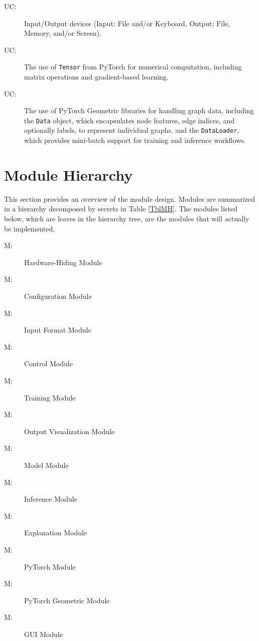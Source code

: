 \documentclass[12pt, titlepage]{article}
\newcounter{ucnum}
\newcommand{\uctheucnum}{UC\theucnum}
\newcounter{mnum}
\newcommand{\mthemnum}{M\themnum}
\begin{document}
\begin{description}
\item[ \uctheucnum \label{ucIO}:] Input/Output devices
  (Input: File and/or Keyboard, Output: File, Memory, and/or Screen).
\item[ \uctheucnum \label{ucI1}:] The use of \texttt{Tensor} from PyTorch for numerical computation, including matrix operations and gradient-based learning.
\item[ \uctheucnum \label{ucI2}:] The use of PyTorch Geometric libraries for handling graph data, including the \texttt{Data} object, which encapsulates node features, edge indices, and optionally labels, to represent individual graphs, and the \texttt{DataLoader}, which provides mini-batch support for training and inference workflows.
\end{description}

\section{Module Hierarchy} \label{SecMH}

This section provides an overview of the module design. Modules are summarized
in a hierarchy decomposed by secrets in Table \ref{TblMH}. The modules listed
below, which are leaves in the hierarchy tree, are the modules that will
actually be implemented.

\begin{description}
\item [ \mthemnum \label{mHH}:]Hardware-Hiding Module
\item [ \mthemnum \label{mConfig}:]Configuration Module
\item [ \mthemnum \label{mInput}:] Input Format Module
\item [ \mthemnum \label{mControl}:] Control Module
\item [ \mthemnum \label{mTrain}:] Training Module
\item [ \mthemnum \label{mVil}:] Output Visualization Module
\item [ \mthemnum \label{mModel}:] Model Module
\item [ \mthemnum \label{mInf}:] Inference Module
\item [ \mthemnum \label{mExp}:] Explanation Module
\item [ \mthemnum \label{mTorch}:] PyTorch Module
\item [ \mthemnum \label{mPyG}:] PyTorch Geometric Module
\item [ \mthemnum \label{mGUI}:] GUI Module

\end{description}
\end{document}
